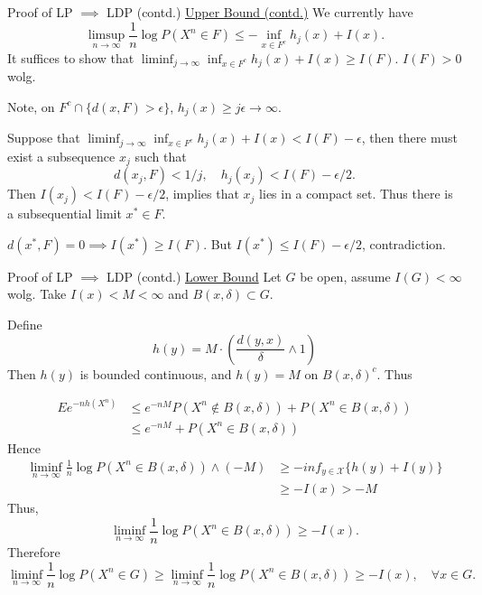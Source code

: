 \documentclass{if-beamer}
\begin{document}
\begin{frame}{Proof of LP $\implies$ LDP (contd.)}
    \underline{Upper Bound (contd.)}
    We currently have
    \[
        \limsup_{n \to \infty} \frac{1}{n} \log P(X^n \in F) 
        \leq -\inf_{x \in F^c} h_j(x) + I(x).
    \]
    It suffices to show that $\liminf_{j \to \infty} \inf_{x \in F^c} h_j(x) + I(x) \geq I(F)$. $I(F)>0$ wolg.
    \vspace{1em }

    Note, on $F^c \cap \{ d(x, F) > \epsilon \}$, $h_j(x) \geq j \epsilon \to \infty$.
    
    Suppose that $\liminf_{j \to \infty} \inf_{x \in F^c} h_j(x) + I(x) < I(F) - \epsilon$,
    then there must exist a subsequence $x_j$ such that
    \[
        d(x_j, F) < 1/j, \quad h_j(x_j)  < I(F) - \epsilon/2.
    \]
    Then $I(x_j) < I(F) - \epsilon/2$, implies that $x_j$ lies in a compact set. Thus there is a subsequential limit $x^* \in F$.
    
    $d(x^*, F) = 0 \implies I(x^*) \geq I(F)$. But $I(x^*) \leq I(F) - \epsilon/2$, contradiction.
\end{frame}

\begin{frame}{Proof of LP $\implies$ LDP (contd.)}
    \underline{Lower Bound} 
    Let $G$ be open, assume $I(G) < \infty$ wolg. Take $I(x) < M < \infty$ and $B(x, \delta) \subset G$.
    
    Define
    \[
        h(y) = M \cdot \left( \frac{d(y, x)}{\delta}\wedge 1\right)
    \]
    Then $h(y)$ is bounded continuous, and $h(y) = M$ on $B(x, \delta)^c$. Thus

    \begin{align*}
        E e^{-n h(X^n)} &\leq e^{-n M} P(X^n \notin B(x, \delta)) + P(X^n \in B(x, \delta)) \\
        &\leq e^{-n M} + P(X^n \in B(x, \delta))
    \end{align*}
    Hence
    \begin{align*}
        \liminf_{n \to \infty} \frac{1}{n} \log P(X^n \in B(x, \delta)) \wedge (-M)
        &\geq -inf_{y \in \mathcal{X}} \{ h(y) + I(y) \} \\
        &\geq - I(x) > -M
    \end{align*}
    Thus,
    \[
        \liminf_{n \to \infty} \frac{1}{n} \log P(X^n \in B(x, \delta)) \geq - I(x).
    \]
    Therefore
    \[
        \liminf_{n \to \infty} \frac{1}{n} \log P(X^n \in G) \geq \liminf_{n \to \infty} \frac{1}{n} \log P(X^n \in B(x, \delta)) \geq - I(x), \quad \forall x \in G.
    \]
\end{frame}
\end{document}
